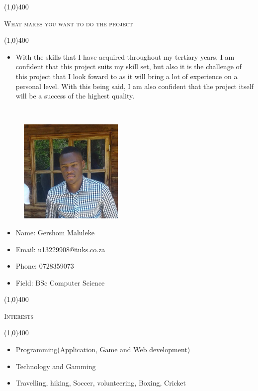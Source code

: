 \documentclass[12pt,a4paper]{report}
\begin{document}
\begin{center}
	
	\line(1,0){400}\\
	{\scshape\large What makes you want to do the project\par}
	\line(1,0){400}\\
	\end{center}
	\begin{itemize}
	\item 
		With the skills that I have acquired throughout my tertiary years, I am confident that this project suits my skill set, but also it is the challenge of this project that I look foward to as it will bring a lot of experience on a personal level. With this being said, I am also confident that the project itself will be a success of the highest quality.
	\end{itemize}

\newpage
\vspace*{-3cm}\
\begin{minipage}{0.5\textwidth}
\begin{figure}[H]
\includegraphics[width=5cm,height=5cm,keepaspectratio]{u13229908.jpg}
\end{figure}
\end{minipage} \hfill
\begin{minipage}{0.6\textwidth}
\begin{itemize}
\item[] Name: Gershom Maluleke
\item[] Email: u13229908@tuks.co.za
\item[] Phone: 0728359073
\item[] Field: BSc Computer Science
\end{itemize}
\end{minipage}

\begin{center}
	
	\line(1,0){400}\\
	{\scshape\large Interests\par}
	\line(1,0){400}\\
	\end{center}
	\begin{itemize}
\item Programming(Application, Game and Web development)    
\item Technology and Gamming
\item  Travelling, hiking, Soccer, volunteering, Boxing, Cricket

\end{itemize}
	
\end{document}
